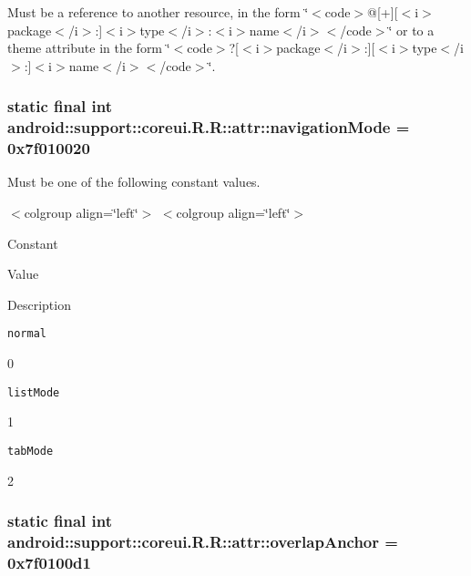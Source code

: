 Must be a reference to another resource, in the form \char`\"{}$<$code$>$@\mbox{[}+\mbox{]}\mbox{[}$<$i$>$package$<$/i$>$:\mbox{]}$<$i$>$type$<$/i$>$:$<$i$>$name$<$/i$>$$<$/code$>$\char`\"{} or to a theme attribute in the form \char`\"{}$<$code$>$?\mbox{[}$<$i$>$package$<$/i$>$:\mbox{]}\mbox{[}$<$i$>$type$<$/i$>$:\mbox{]}$<$i$>$name$<$/i$>$$<$/code$>$\char`\"{}. \hypertarget{classandroid_1_1support_1_1coreui_1_1_r_1_1attr_503c60ec66345d70d72aa8d017743bfa}{
\subsubsection[{navigationMode}]{\setlength{\rightskip}{0pt plus 5cm}static final int android::support::coreui.R.R::attr::navigationMode = 0x7f010020}}
\label{classandroid_1_1support_1_1coreui_1_1_r_1_1attr_503c60ec66345d70d72aa8d017743bfa}


Must be one of the following constant values. \begin{TabularC}{0}
\hline
\end{TabularC}
$<$colgroup align=\char`\"{}left\char`\"{}$>$ $<$colgroup align=\char`\"{}left\char`\"{}$>$ 

Constant

Value

Description 

{\tt normal}

0

{\tt listMode}

1

{\tt tabMode}

2\hypertarget{classandroid_1_1support_1_1coreui_1_1_r_1_1attr_6b940d3fa7cc34f0415c1e8b271c147f}{
\subsubsection[{overlapAnchor}]{\setlength{\rightskip}{0pt plus 5cm}static final int android::support::coreui.R.R::attr::overlapAnchor = 0x7f0100d1}}
\label{classandroid_1_1support_1_1coreui_1_1_r_1_1attr_6b940d3fa7cc34f0415c1e8b271c147f}


